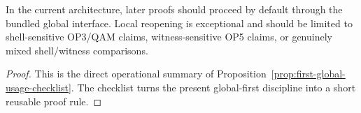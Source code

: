 \begin{corollary}
\label{cor:practical-default-rule-global-first-local-only-if-needed}
In the current architecture, later proofs should proceed by default through the bundled global interface. Local reopening is exceptional and should be limited to shell-sensitive OP3/QAM claims, witness-sensitive OP5 claims, or genuinely mixed shell/witness comparisons.
\end{corollary}

\begin{proof}
This is the direct operational summary of Proposition~\ref{prop:first-global-usage-checklist}. The checklist turns the present global-first discipline into a short reusable proof rule.
\end{proof}


